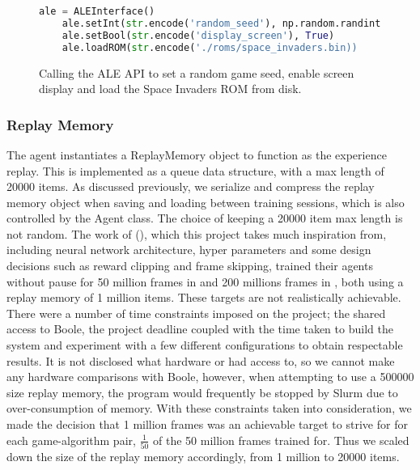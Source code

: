 \begin{figure}[h]
    \centering
    \begin{lstlisting}[language=Python]
    ale = ALEInterface()
    ale.setInt(str.encode('random_seed'), np.random.randint(100))
    ale.setBool(str.encode('display_screen'), True)
    ale.loadROM(str.encode('./roms/space_invaders.bin))
    \end{lstlisting}
    \caption{Calling the ALE API to set a random game seed, enable screen display and load the Space Invaders ROM from disk.}
    \label{fig:aleflags}
\end{figure}

\subsubsection{Replay Memory}
The agent instantiates a ReplayMemory object to function as the experience replay. This is implemented as a queue data structure, with a max length of 20000 items. As discussed previously, we serialize and compress the replay memory object when saving and loading between training sessions, which is also controlled by the Agent class. The choice of keeping a 20000 item max length is not random. The work  of (\citet{deepmind1,human}), which this project takes much inspiration from, including neural network architecture, hyper parameters and some design decisions such as reward clipping and frame skipping, trained their agents without pause for 50 million frames in \citet{deepmind1} and 200 millions frames in \citet{human}, both using a replay memory of 1 million items. These targets are not realistically achievable. There were a number of time constraints imposed on the project; the shared access to Boole, the project deadline coupled with the time taken to build the system and experiment with a few different configurations to obtain respectable results. It is not disclosed what hardware \citet{deepmind1} or \cite{human} had access to, so we cannot make any hardware comparisons with Boole, however, when attempting to use a 500000 size replay memory, the program would frequently be stopped by Slurm due to over-consumption of memory. With these constraints taken into consideration, we made the decision that 1 million frames was an achievable target to strive for for each game-algorithm pair, $\frac{1}{50}$ of the 50 million frames \citet{deepmind1} trained for. Thus we scaled down the size of the replay memory accordingly, from 1 million to 20000 items.

